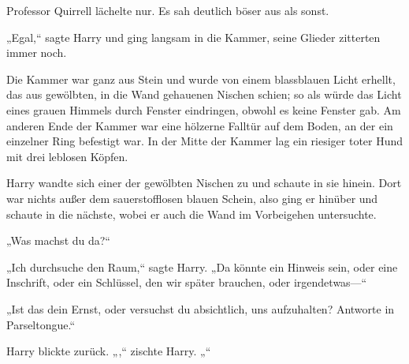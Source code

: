 Professor Quirrell lächelte nur. Es sah deutlich böser aus als sonst.

„Egal,“ sagte Harry und ging langsam in die Kammer, seine Glieder zitterten immer noch.

Die Kammer war ganz aus Stein und wurde von einem blassblauen Licht erhellt, das aus gewölbten, in die Wand gehauenen Nischen schien; so als würde das Licht eines grauen Himmels durch Fenster eindringen, obwohl es keine Fenster gab. Am anderen Ende der Kammer war eine hölzerne Falltür auf dem Boden, an der ein einzelner Ring befestigt war. In der Mitte der Kammer lag ein riesiger toter Hund mit drei leblosen Köpfen.

Harry wandte sich einer der gewölbten Nischen zu und schaute in sie hinein. Dort war nichts außer dem sauerstofflosen blauen Schein, also ging er hinüber und schaute in die nächste, wobei er auch die Wand im Vorbeigehen untersuchte.

„Was machst du da?“

„Ich durchsuche den Raum,“ sagte Harry. „Da könnte ein Hinweis sein, oder eine Inschrift, oder ein Schlüssel, den wir später brauchen, oder irgendetwas—“

„Ist das dein Ernst, oder versuchst du absichtlich, uns aufzuhalten? Antworte in Parseltongue.“

Harry blickte zurück.
„,“ zischte Harry. „“

